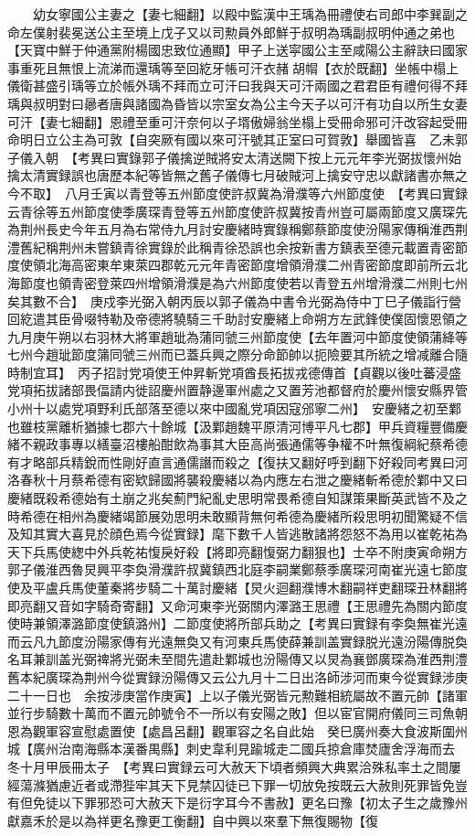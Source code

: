 　　幼女寧國公主妻之【妻七細翻】以殿中監漢中王瑀為冊禮使右司郎中李巽副之命左僕射裴冕送公主至境上戊子又以司勲員外郎鮮于叔明為瑀副叔明仲通之弟也【天寶中鮮于仲通黨附楊國忠致位通顯】甲子上送寜國公主至咸陽公主辭訣曰國家事重死且無恨上流涕而還瑀等至回紇牙帳可汗衣赭胡㡌【衣於既翻】坐帳中榻上儀衛甚盛引瑀等立於帳外瑀不拜而立可汗曰我與天可汗兩國之君君臣有禮何得不拜瑀與叔明對曰曏者唐與諸國為昏皆以宗室女為公主今天子以可汗有功自以所生女妻可汗【妻七細翻】恩禮至重可汗奈何以子壻傲婦翁坐榻上受冊命邪可汗改容起受冊命明日立公主為可敦【自突厥有國以來可汗號其正室曰可賀敦】舉國皆喜　乙未郭子儀入朝　【考異曰實錄郭子儀擒逆賊將安太清送闕下按上元元年李光弼拔懷州始擒太清實録誤也唐歷本紀等皆無之舊子儀傳七月破賊河上擒安守忠以獻諸書亦無之今不取】　八月壬寅以青登等五州節度使許叔冀為滑濮等六州節度使　【考異曰實録云青徐等五州節度使季廣琛青登等五州節度使許叔冀按青州豈可屬兩節度又廣琛先為荆州長史今年五月為右常侍九月討安慶緒時實錄稱鄭蔡節度使汾陽家傳稱淮西荆澧舊紀稱荆州未嘗鎮青徐實錄於此稱青徐恐誤也余按新書方鎮表至德元載置青密節度使領北海高密東牟東萊四郡乾元元年青密節度增領滑濮二州青密節度即前所云北海節度也領青密登萊四州增領滑濮是為六州節度使若以青登五州增滑濮二州則七州矣其數不合】　庚戍李光弼入朝丙辰以郭子儀為中書令光弼為侍中丁巳子儀詣行營　回紇遣其臣骨啜特勒及帝德將驍騎三千助討安慶緒上命朔方左武鋒使僕固懷恩領之　九月庚午朔以右羽林大將軍趙玼為蒲同虢三州節度使【去年置河中節度使領蒲絳等七州今趙玼節度䈬同虢三州而已蓋兵興之際分命節帥以扼險要其所統之增减離合隨時制宜耳】　丙子招討党項使王仲昇斬党項酋長拓拔戎德傳首【貞觀以後吐蕃浸盛党項拓拔諸部畏偪請内徙詔慶州置静邊軍州處之又置芳池都督府於慶州懷安縣界管小州十以處党項野利氏部落至德以來中國亂党項因寇邠寧二州】　安慶緒之初至鄴也雖枝黨離析猶據七郡六十餘城【汲鄴趙魏平原清河博平凡七郡】甲兵資糧豐備慶緒不親政事專以繕臺沼樓船酣飲為事其大臣高尚張通儒等争權不叶無復綱紀蔡希德有才略部兵精銳而性剛好直言通儒譖而殺之【復扶又翻好呼到翻下好殺同考異曰河洛春秋十月蔡希德有密欵歸國將襲殺慶緒以為内應左右泄之慶緒斬希德於鄴中又曰慶緒既殺希德始有土崩之兆矣薊門紀亂史思明常畏希德自知謀策果斷英武皆不及之時希德在相州為慶緒竭節展効思明未敢顯背無何希德為慶緒所殺思明初聞驚疑不信及知其實大喜見於顔色焉今從實録】麾下數千人皆逃散諸將怨怒不為用以崔乾祐為天下兵馬使緫中外兵乾祐愎戾好殺【將即亮翻愎弼力翻狠也】士卒不附庚寅命朔方郭子儀淮西魯炅興平李奐滑濮許叔冀鎮西北庭李嗣業鄭蔡季廣琛河南崔光遠七節度使及平盧兵馬使董秦將步騎二十萬討慶緒【炅火迴翻濮博木翻嗣祥吏翻琛丑林翻將即亮翻又音如字騎奇寄翻】又命河東李光弼關内澤潞王思禮【王思禮先為關内節度使時兼領澤潞節度使鎮潞州】二節度使將所部兵助之【考異曰實録有李奐無崔光遠而云凡九節度汾陽家傳有光遠無奐又有河東兵馬使薛兼訓盖實録脱光遠汾陽傳脱奐名耳兼訓盖光弼禆將光弼未至間先遣赴鄴城也汾陽傳又以炅為襄鄧廣琛為淮西荆澧舊本紀廣琛為荆州今從實録汾陽傳又云公九月十二日出洛師涉河而東今從實録涉庚二十一日也　余按涉庚當作庚寅】上以子儀光弼皆元勲難相統屬故不置元帥【諸軍並行步騎數十萬而不置元帥號令不一所以有安陽之敗】但以宦官開府儀同三司魚朝恩為觀軍容宣慰處置使【處昌呂翻】觀軍容之名自此始　癸巳廣州奏大食波斯圍州城【廣州治南海縣本漢番禺縣】刺史韋利見踰城走二國兵掠倉庫焚廬舍浮海而去　冬十月甲辰冊太子　【考異曰實録云可大赦天下頃者頻興大典累洽殊私率土之間屢經蕩滌猶慮近者或滯狴牢其天下見禁囚徒已下罪一切放免按既云大赦則死罪皆免豈有但免徒以下罪邪恐可大赦天下是衍字耳今不書赦】更名曰豫【初太子生之歲豫州獻嘉禾於是以為祥更名豫更工衡翻】自中興以來羣下無復賜物【復